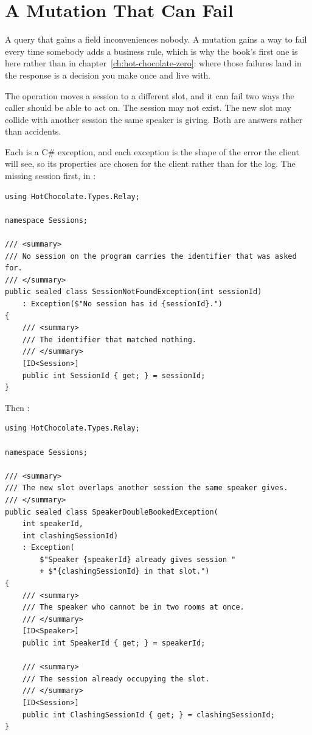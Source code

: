 \section{A Mutation That Can Fail}
\label{sec:ch04-a-mutation-that-can-fail}

%
A query that gains a field inconveniences nobody. A mutation gains a way to
fail every time somebody adds a business rule, which is why the book's first
one is here rather than in chapter~\ref{ch:hot-chocolate-zero}: where those
failures land in the response is a decision you make once and live with.

%
The operation moves a session to a different slot, and it can fail two ways
the caller should be able to act on. The session may not exist. The new slot
may collide with another session the same speaker is giving. Both are answers
rather than accidents.

%
Each is a C\# exception, and each exception is the shape of the error the
client will see, so its properties are chosen for the client rather than for
the log. The missing session first, in
:

\begin{verbatim}
using HotChocolate.Types.Relay;

namespace Sessions;

/// <summary>
/// No session on the program carries the identifier that was asked for.
/// </summary>
public sealed class SessionNotFoundException(int sessionId)
    : Exception($"No session has id {sessionId}.")
{
    /// <summary>
    /// The identifier that matched nothing.
    /// </summary>
    [ID<Session>]
    public int SessionId { get; } = sessionId;
}
\end{verbatim}

Then :

\begin{verbatim}
using HotChocolate.Types.Relay;

namespace Sessions;

/// <summary>
/// The new slot overlaps another session the same speaker gives.
/// </summary>
public sealed class SpeakerDoubleBookedException(
    int speakerId,
    int clashingSessionId)
    : Exception(
        $"Speaker {speakerId} already gives session "
        + $"{clashingSessionId} in that slot.")
{
    /// <summary>
    /// The speaker who cannot be in two rooms at once.
    /// </summary>
    [ID<Speaker>]
    public int SpeakerId { get; } = speakerId;

    /// <summary>
    /// The session already occupying the slot.
    /// </summary>
    [ID<Session>]
    public int ClashingSessionId { get; } = clashingSessionId;
}
\end{verbatim}

